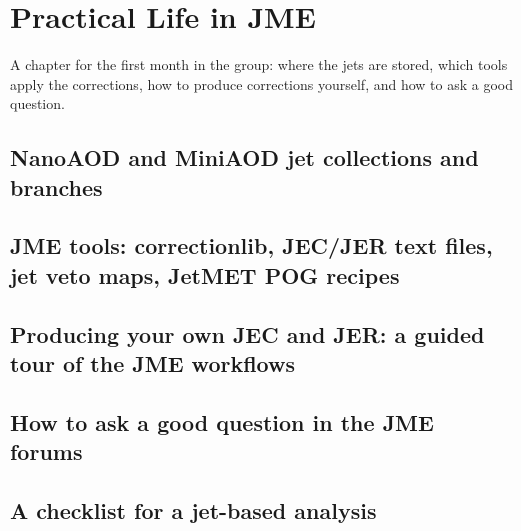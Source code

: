 \chapter{Practical Life in JME}
\label{ch:practical_life}

\begin{journeybox}
A chapter for the first month in the group: where the jets are stored, which
tools apply the corrections, how to produce corrections yourself, and how to ask
a good question.
\end{journeybox}


\section{NanoAOD and MiniAOD jet collections and branches}
\label{sec:practical_life:nanoaod_and_miniaod_jet_collections_and_}

\section{JME tools: correctionlib, JEC/JER text files, jet veto maps, JetMET POG recipes}
\label{sec:practical_life:jme_tools_correctionlib_jec_jer_text_fil}

\section{Producing your own JEC and JER: a guided tour of the JME workflows}
\label{sec:practical_life:producing_your_own_jec_and_jer_a_guided_}

\section{How to ask a good question in the JME forums}
\label{sec:practical_life:how_to_ask_a_good_question_in_the_jme_fo}

\section{A checklist for a jet-based analysis}
\label{sec:practical_life:a_checklist_for_a_jet_based_analysis}

\begin{pitfalls}
\end{pitfalls}

\begin{exercises}
\item {}
\item {}
\end{exercises}
